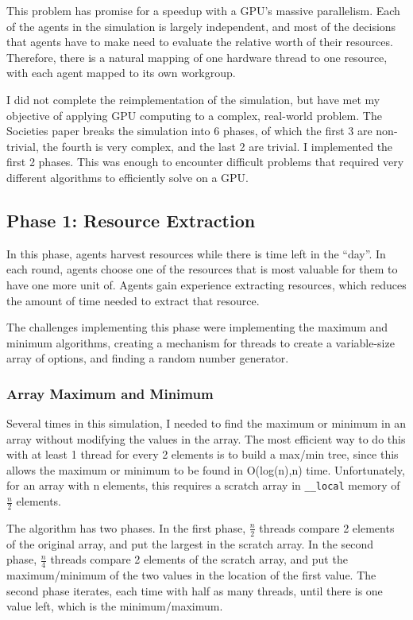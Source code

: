 \documentclass{article}
\begin{document}
This problem has promise for a speedup with a GPU's massive parallelism. Each of the agents in the simulation is largely independent, and most of the decisions that agents have to make need to evaluate the relative worth of their resources. Therefore, there is a natural mapping of one hardware thread to one resource, with each agent mapped to its own workgroup.

I did not complete the reimplementation of the simulation, but have met my objective of applying GPU computing to a complex, real-world problem. The Societies paper\cite{ditta13} breaks the simulation into 6 phases, of which the first 3 are non-trivial, the fourth is very complex, and the last 2 are trivial. I implemented the first 2 phases. This was enough to encounter difficult problems that required very different algorithms to efficiently solve on a GPU.

\subsection{Phase 1: Resource Extraction}
In this phase, agents harvest resources while there is time left in the ``day''. In each round, agents choose one of the resources that is most valuable for them to have one more unit of. Agents gain experience extracting resources, which reduces the amount of time needed to extract that resource.

The challenges implementing this phase were implementing the maximum and minimum algorithms, creating a mechanism for threads to create a variable-size array of options, and finding a random number generator.

\subsubsection{Array Maximum and Minimum}
Several times in this simulation, I needed to find the maximum or minimum in an array without modifying the values in the array. The most efficient way to do this with at least 1 thread for every 2 elements is to build a max/min tree, since this allows the maximum or minimum to be found in O(log(n),n) time. Unfortunately, for an array with n elements, this requires a scratch array in \texttt{\_\_local} memory of $\frac{n}{2}$ elements.

The algorithm has two phases. In the first phase, $\frac{n}{2}$ threads compare 2 elements of the original array, and put the largest in the scratch array. In the second phase, $\frac{n}{4}$ threads compare 2 elements of the scratch array, and put the maximum/minimum of the two values in the location of the first value. The second phase iterates, each time with half as many threads, until there is one value left, which is the minimum/maximum.
\end{document}
